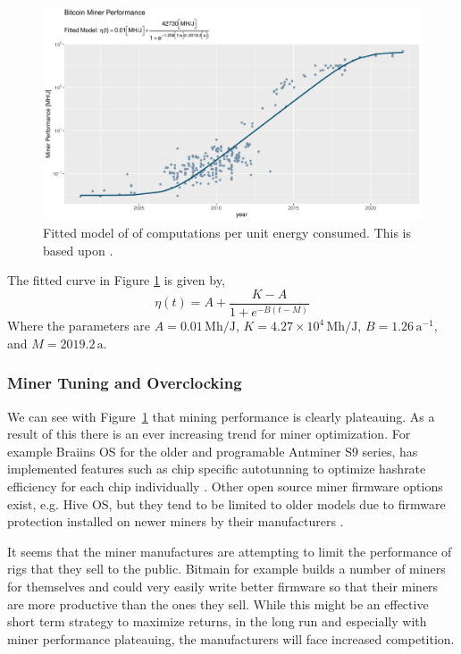 \documentclass[runningheads]{llncs}
\begin{document}
\begin{figure}
    \includegraphics[width=\textwidth]{BTC Mining Performance.pdf}
    \caption{Fitted model of of computations per unit energy consumed. This is based upon \cite{kuf2019mining}.} \label{fig:3}
\end{figure}

The fitted curve in Figure \ref{fig:3} is given by,
\begin{equation}
    \eta(t) = A + \frac{K - A}{1 + e^{-B(t - M)}} \label{eq:20}
\end{equation}
Where the parameters are $A = 0.01 \,\textrm{Mh/J}$, $K = 4.27\times 10^4 \,\textrm{Mh/J}$,  $B = 1.26 \,\textrm{a}^{-1}$, and $ M = 2019.2 \,\textrm{a}$.


\subsubsection{Miner Tuning and Overclocking}
We can see with Figure~\ref{fig:3} that mining performance is clearly plateauing.
As a result of this there is an ever increasing trend for miner optimization.
For example Braiins OS for the older and programable Antminer S9 series, has implemented features such as chip specific autotunning to optimize hashrate efficiency for each chip individually \cite{braiins2021autotuning}.
Other open source miner firmware options exist, e.g. Hive OS, but they tend to be limited to older models due to firmware protection installed on newer miners by their manufacturers \cite{hiveos2020update}.

It seems that the miner manufactures are attempting to limit the performance of rigs that they sell to the public.
Bitmain for example builds a number of miners for themselves and could very easily write better firmware so that their miners are more productive than the ones they sell.
While this might be an effective short term strategy to maximize returns, in the long run and especially with miner performance plateauing, the manufacturers will face increased competition.
\end{document}
